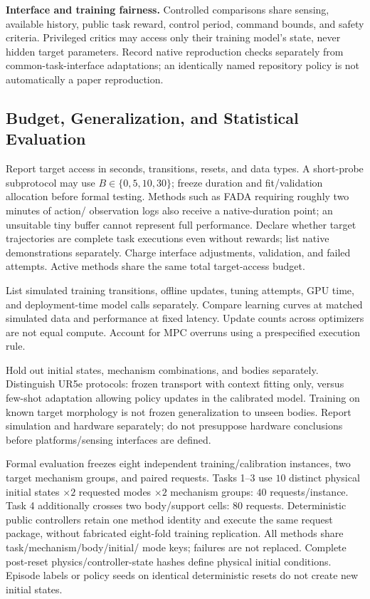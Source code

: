 \textbf{Interface and training fairness.} Controlled comparisons share sensing,
available history, public task reward, control period, command bounds, and safety
criteria. Privileged critics may access only their training model's state, never hidden
target parameters. Record native reproduction checks separately from common-task-interface
adaptations; an identically named repository policy is not automatically a paper reproduction.

\subsection{Budget, Generalization, and Statistical Evaluation}
Report target access in seconds, transitions, resets, and data types. A short-probe
subprotocol may use $B\in\{0,5,10,30\}$; freeze duration and fit/validation allocation
before formal testing. Methods such as FADA requiring roughly two minutes of action/
observation logs also receive a native-duration point\cite{fada}; an unsuitable tiny
buffer cannot represent full performance. Declare whether target trajectories are
complete task executions even without rewards; list native demonstrations separately.
Charge interface adjustments, validation, and failed attempts. Active methods share
the same total target-access budget.

List simulated training transitions, offline updates, tuning attempts, GPU time,
and deployment-time model calls separately. Compare learning curves at matched simulated
data and performance at fixed latency. Update counts across optimizers are not equal
compute. Account for MPC overruns using a prespecified execution rule.

Hold out initial states, mechanism combinations, and bodies separately. Distinguish
UR5e protocols: frozen transport with context fitting only, versus few-shot adaptation
allowing policy updates in the calibrated model. Training on known target morphology
is not frozen generalization to unseen bodies. Report simulation and hardware separately;
do not presuppose hardware conclusions before platforms/sensing interfaces are defined.

Formal evaluation freezes eight independent training/calibration instances, two target
mechanism groups, and paired requests. Tasks 1--3 use $10$ distinct physical initial
states $\times2$ requested modes $\times2$ mechanism groups: $40$ requests/instance.
Task 4 additionally crosses two body/support cells: $80$ requests. Deterministic public
controllers retain one method identity and execute the same request package, without
fabricated eight-fold training replication. All methods share task/mechanism/body/initial/
mode keys; failures are not replaced. Complete post-reset physics/controller-state
hashes define physical initial conditions. Episode labels or policy seeds on identical
deterministic resets do not create new initial states.

